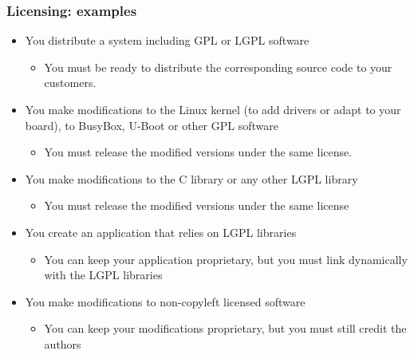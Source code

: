 \begin{frame}
  \frametitle{Licensing: examples}
  \begin{itemize}
  \item You distribute a system including GPL or LGPL software
    \begin{itemize}
    \item You must be ready to distribute the corresponding
      source code to your customers.
    \end{itemize}
  \item You make modifications to the Linux kernel (to add drivers or
    adapt to your board), to BusyBox, U-Boot or other GPL software
    \begin{itemize}
    \item You must release the modified versions under the same license.
    \end{itemize}
  \item You make modifications to the C library or any other LGPL library
    \begin{itemize}
    \item You must release the modified versions under the same license
    \end{itemize}
  \item You create an application that relies on LGPL libraries
    \begin{itemize}
    \item You can keep your application proprietary, but you must link
      dynamically with the LGPL libraries
    \end{itemize}
  \item You make modifications to non-copyleft licensed software
    \begin{itemize}
    \item You can keep your modifications proprietary, but you must
      still credit the authors
    \end{itemize}
  \end{itemize}
\end{frame}

